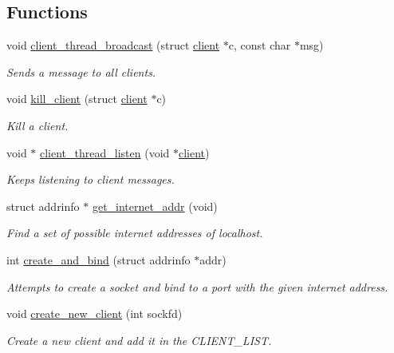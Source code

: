 \subsection*{Functions}
\begin{DoxyCompactItemize}
\item 
void \hyperlink{zip-zop-server_8c_a3608e5c14908c59afe16bf1fc85895c9}{client\+\_\+thread\+\_\+broadcast} (struct \hyperlink{structclient}{client} $\ast$c, const char $\ast$msg)
\begin{DoxyCompactList}\small\item\em Sends a message to all clients. \end{DoxyCompactList}\item 
void \hyperlink{zip-zop-server_8c_ae5845d7e65c1c7407d1df63105450b5e}{kill\+\_\+client} (struct \hyperlink{structclient}{client} $\ast$c)
\begin{DoxyCompactList}\small\item\em Kill a client. \end{DoxyCompactList}\item 
void $\ast$ \hyperlink{zip-zop-server_8c_a9076f5ad072ef4654917b662bfdd94ce}{client\+\_\+thread\+\_\+listen} (void $\ast$\hyperlink{structclient}{client})
\begin{DoxyCompactList}\small\item\em Keeps listening to client messages. \end{DoxyCompactList}\item 
struct addrinfo $\ast$ \hyperlink{zip-zop-server_8c_a2d9748875d07382b9dbecb97c6cd9b62}{get\+\_\+internet\+\_\+addr} (void)
\begin{DoxyCompactList}\small\item\em Find a set of possible internet addresses of localhost. \end{DoxyCompactList}\item 
int \hyperlink{zip-zop-server_8c_a0ecdeaf556729d827a07915b7a89866c}{create\+\_\+and\+\_\+bind} (struct addrinfo $\ast$addr)
\begin{DoxyCompactList}\small\item\em Attempts to create a socket and bind to a port with the given internet address. \end{DoxyCompactList}\item 
void \hyperlink{zip-zop-server_8c_ab9a14cd690eac9781dd224e034fbd01d}{create\+\_\+new\+\_\+client} (int sockfd)
\begin{DoxyCompactList}\small\item\em Create a new client and add it in the {\ttfamily C\+L\+I\+E\+N\+T\+\_\+\+L\+I\+ST}. \end{DoxyCompactList}\item 

\end{DoxyCompactItemize}
